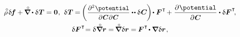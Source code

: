 \begin{otherlanguage}{russian}
\nopagebreak\vspace{-0.05em}\begin{equation}\label{variationsforcurrentconfiguration}
\begin{array}{c}
\mathcircabove{\rho} \hspace{.25ex} \variation{\hspace{-0.2ex}\bm{f}}
+ \hspace{-0.1ex} \boldnablacircled \hspace{-0.1ex} \dotp \variation{\hspace{.1ex}\firstpiolakirchhoffstress}
= \bm{0}
\hspace{.1ex} , \:\,
%
\variation{\hspace{.1ex}\firstpiolakirchhoffstress} \hspace{-0.1ex}
= \hspace{-0.2ex} \left( \hspace{.1ex} \scalebox{0.92}{$ \displaystyle \frac{\partial^2 \hspace{.1ex} \potential}{\raisemath{-0.1em}{\partial \hspace{.1ex} \bm{C} \hspace{.1ex} \partial \hspace{.1ex} \bm{C}}} $} \dotdotp \variation{\hspace{.12ex}\bm{C}} \hspace{-0.16ex} \right) \hspace{-0.32ex} \dotp \bm{F}^{\hspace{.1ex}\T} \hspace{-0.24ex}
+ \hspace{.1ex}
\displaystyle \frac{\partial \hspace{.1ex} \potential}{\raisemath{-0.1em}{\partial \hspace{.1ex} \bm{C}}} \dotp \variation{\bm{F}}^{\hspace{.1ex}\T}
\hspace{-0.4ex} ,
\\[1em]
%
\variation{\bm{F}}^{\hspace{.1ex}\T} \hspace{-0.5ex}
= \variation{\hspace{.1ex} \boldnablacircled \currentlocationvector}
= \hspace{-0.2ex} \boldnablacircled \hspace{.1ex} \variation{\currentlocationvector}
= \hspace{-0.12ex} \bm{F}^{\hspace{.1ex}\T} \hspace{-0.25ex} \dotp \boldnabla \hspace{.1ex} \variation{\currentlocationvector} \hspace{.16ex},

\end{array}
\end{equation}
\end{otherlanguage}
